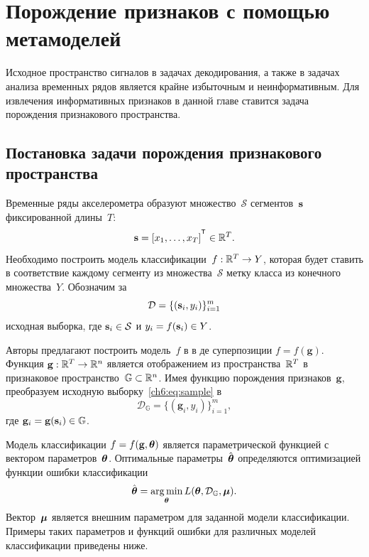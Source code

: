 \chapter{Порождение признаков с помощью метамоделей}
\label{ch:metamodels}

Исходное пространство сигналов в задачах декодирования, а также в задачах анализа временных рядов является крайне избыточным и неинформативным.
Для извлечения информативных признаков в данной главе ставится задача порождения признакового пространства.

\section{Постановка задачи порождения признакового пространства}
\label{sec:ch6:feature_generation}

Временные ряды акселерометра образуют множество~$\mathcal{S}$ сегментов~$\mathbf{s}$ фиксированной длины~$T$:
\[
	\bs = [x_1, \dots, x_T]^{\T} \in \bbR^T.
\]
Необходимо построить модель классификации~$f: \mathbb{R}^T \rightarrow Y$, которая будет ставить в соответствие каждому сегменту из множества~$\mathcal{S}$ метку класса из конечного множества~$Y$.
Обозначим за
\begin{equation}
	\mathcal{D} = \{(\mathbf{s}_i, y_i)\}_{i=1}^m
	\label{ch6:eq:sample}
\end{equation}
исходная выборка, где $\mathbf{s}_i \in \mathcal{S}$ и $y_i = f(\mathbf{s}_i)\in Y$.

Авторы предлагают построить модель~$f$ в в де суперпозиции $f=f(\mathbf{g})$.
Функция $\mathbf{g}: \mathbb{R}^T \rightarrow \mathbb{R}^n$ является отображением из пространства~$\mathbb{R}^{T} $ в признаковое пространство~$\mathbb{G} \subset \mathbb{R}^n$.
Имея функцию порождения признаков~$\mathbf{g}$, преобразуем исходную выборку~\eqref{ch6:eq:sample} в
\[
	\mathcal{D}_\mathbb{G} = \{(\mathbf{g}_i, y_i)\}_{i=1}^m,
\]
где $\mathbf{g}_i = \mathbf{g}(\mathbf{s}_i) \in \mathbb{G}$. 

Модель классификации $f=f(\mathbf{g}, \boldsymbol{\theta})$ является параметрической функцией с вектором параметров~$\boldsymbol{\theta}$. 
Оптимальные параметры~$\hat{\boldsymbol{\theta}}$ определяются оптимизацией функции ошибки классификации
\begin{equation}
	\hat{\boldsymbol{\theta}} = \mathop{\arg \min}\limits_{\boldsymbol{\theta}} L(\boldsymbol{\theta}, \mathcal{D}_\mathbb{G}, \boldsymbol{\mu}).
	\label{ch6:eq:optimal_classification_params}
\end{equation}
Вектор~$\boldsymbol{\mu}$ является внешним параметром для заданной модели классификации. 
Примеры таких параметров и функций ошибки для различных моделей классификации приведены ниже.

